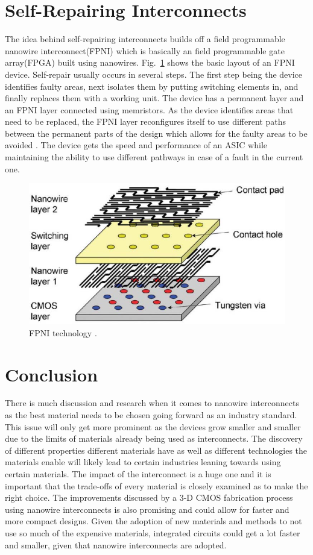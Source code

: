 \documentclass[conference]{IEEEtran}
\begin{document}
\section{Self-Repairing Interconnects}
The idea behind self-repairing interconnects builds off a field programmable nanowire interconnect(FPNI)
which is basically an field programmable gate array(FPGA) built using nanowires. Fig.~\ref{fig:fpni}
shows the basic layout of an FPNI device. Self-repair usually occurs in several steps. The first step
being the device identifies faulty areas, next isolates them by putting switching elements in, and finally
replaces them with a working unit. The device has a permanent layer and an FPNI layer connected
using memristors. As the device identifies areas that need to be replaced, the FPNI layer reconfigures itself
to use different paths between the permanent parts of the design which allows for the faulty areas to be
avoided \cite{8423678}. The device gets the speed and performance of an ASIC while maintaining the ability to
use different pathways in case of a fault in the current one.
\begin{figure}[!htb]
    \centering
    \includegraphics[width=\linewidth]{figures/fpni.png}
    \caption{FPNI technology \cite{8423678}.}\label{fig:fpni}
\end{figure}

\section{Conclusion}
There is much discussion and research when it comes to nanowire interconnects as
the best material needs to be chosen going forward as an industry standard. This
issue will only get more prominent as the devices grow smaller and smaller due
to the limits of materials already being used as interconnects. The discovery of
different properties different materials have as well as different technologies
the materials enable will likely lead to certain industries leaning towards using
certain materials. The impact of the interconnect is a huge one and it is important
that the trade-offs of every material is closely examined as to make the right choice.
The improvements discussed by a 3-D CMOS fabrication process using nanowire interconnects
is also promising and could allow for faster and more compact designs. Given the adoption
of new materials and methods to not use so much of the expensive materials, integrated
circuits could get a lot faster and smaller, given that nanowire interconnects are adopted.


\end{document}
